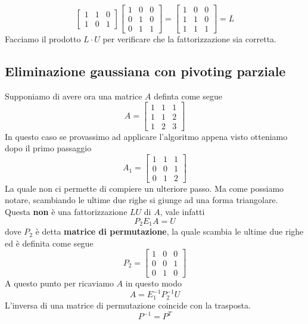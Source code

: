 \begin{example}
\[\begin{bmatrix}
			1 & 1 & 0 \\
			1 & 0 & 1
		\end{bmatrix} \begin{bmatrix}
			1 & 0 & 0 \\
			0 & 1 & 0 \\
			0 & 1 & 1
		\end{bmatrix} = \begin{bmatrix}
			1 & 0 & 0 \\
			1 & 1 & 0 \\
			1 & 1 & 1
		\end{bmatrix} = L
	\]
	Facciamo il prodotto $L \cdot U$ per verificare che la fattorizzazione sia corretta.
\end{example}

\subsection{Eliminazione gaussiana con pivoting parziale}
Supponiamo di avere ora una matrice $A$ definta come segue
\[
	A = \begin{bmatrix}
		1 & 1 & 1 \\
		1 & 1 & 2 \\
		1 & 2 & 3
	\end{bmatrix}
\]
In questo caso se provassimo ad applicare l'algoritmo appena visto otteniamo dopo il primo passaggio
\[
	A_1 = \begin{bmatrix}
		1 & 1 & 1 \\
		0 & 0 & 1 \\
		0 & 1 & 2
	\end{bmatrix}
\]
La quale non ci permette di compiere un ulteriore passo. Ma come possiamo notare, scambiando le ultime due righe
si giunge ad una forma triangolare. Questa \textbf{non} è una fattorizzazione $LU$ di $A$, vale infatti
\[ P_2 E_1 A = U \]
dove $P_2$ è detta \textbf{matrice di permutazione}, la quale scambia le ultime due righe ed è definita come
segue
\[
	P_2 = \begin{bmatrix}
		1 & 0 & 0 \\
		0 & 0 & 1 \\
		0 & 1 & 0
	\end{bmatrix}
\]
A questo punto per ricaviamo $A$ in questo modo
\[ A = E_1^{-1} P_2^{-1} U \]
L'inversa di una matrice di permutazione coincide con la trasposta.
\[ P^{-1} = P^T \]

